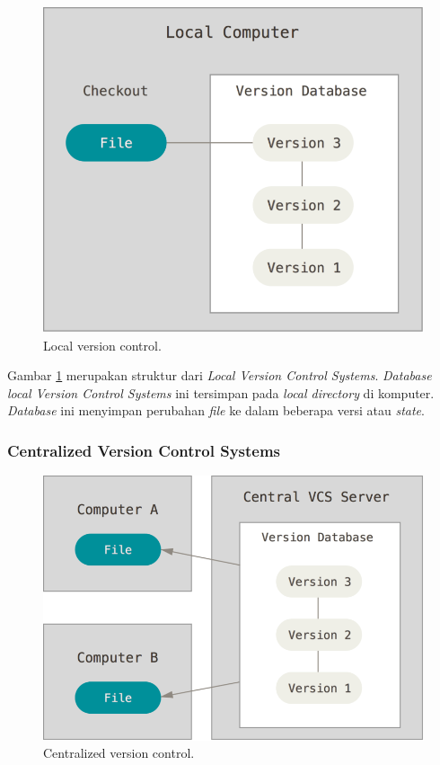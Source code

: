 \begin{figure}[H]
	\centering
		\includegraphics[scale=0.25]{Gambar/localvcs.png}
	\caption{Local version control\cite{chacon2014pro}.}
	\label{fig:localvcs}
\end{figure}

Gambar \ref{fig:localvcs} merupakan struktur dari \textit{Local Version Control Systems}. \textit{Database local Version Control Systems} ini tersimpan pada \textit{local directory} di komputer. \textit{Database} ini menyimpan perubahan \textit{file} ke dalam beberapa versi atau \textit{state}.  
 
\subsubsection{Centralized Version Control Systems}
\begin{figure}[H]
	\centering
		\includegraphics[scale=0.25]{Gambar/centralizedvcs.png}
	\caption{Centralized version control\cite{chacon2014pro}.}
	\label{fig:cvcs}
\end{figure}

